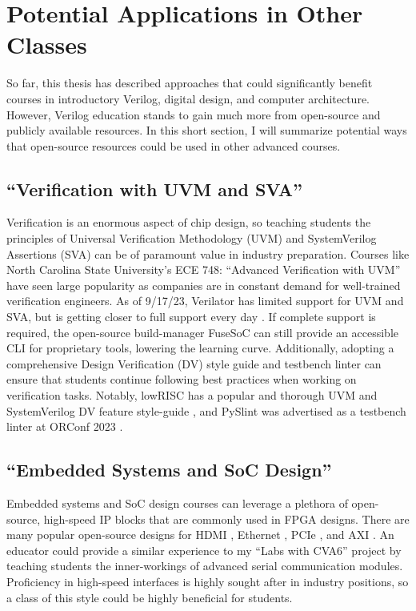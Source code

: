 
\chapter{Potential Applications in Other Classes}
\label{chapter:other_classes}

So far, this thesis has described approaches that could significantly benefit courses in introductory Verilog, digital design, and computer architecture. However, Verilog education stands to gain much more from open-source and publicly available resources. In this short section, I will summarize potential ways that open-source resources could be used in other advanced courses.

\section{``Verification with UVM and SVA''}

Verification is an enormous aspect of chip design, so teaching students the principles of Universal Verification Methodology (UVM) and SystemVerilog Assertions (SVA) can be of paramount value in industry preparation. Courses like North Carolina State University's ECE 748: ``Advanced Verification with UVM'' have seen large popularity as companies are in constant demand for well-trained verification engineers. As of 9/17/23, Verilator has limited support for UVM and SVA, but is getting closer to full support every day \cite{VerilatorUVM, BieganskiORConf, VerilatorSVA}. If complete support is required, the open-source build-manager FuseSoC can still provide an accessible CLI for proprietary tools, lowering the learning curve. Additionally, adopting a comprehensive Design Verification (DV) style guide and testbench linter can ensure that students continue following best practices when working on verification tasks. Notably, lowRISC has a popular and thorough UVM and SystemVerilog DV feature style-guide \cite{lowRISCstyleguides}, and PySlint was advertised as a testbench linter at ORConf 2023 \cite{paulORConf}.

\section{``Embedded Systems and SoC Design''}

Embedded systems and SoC design courses can leverage a plethora of open-source, high-speed IP blocks that are commonly used in FPGA designs. There are many popular open-source designs for HDMI \cite{hdlutilhdmiGitHub, projfdisplaycontrollerGitHub, cliffordwolfSimpleVOutGitHub}, Ethernet \cite{alexforencichverilogethernetGitHub}, PCIe \cite{alexforencichverilogpcieGitHub, enjoydigitallitepcieGitHub}, and AXI \cite{pulpplatformaxiGitHub, alexforencichverilogaxiGitHub}. An educator could provide a similar experience to my ``Labs with CVA6'' project by teaching students the inner-workings of advanced serial communication modules. Proficiency in high-speed interfaces is highly sought after in industry positions, so a class of this style could be highly beneficial for students.

